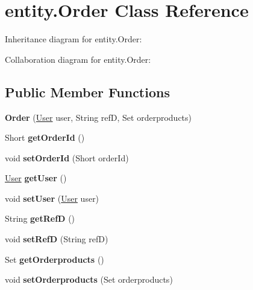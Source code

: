 \hypertarget{classentity_1_1_order}{}\section{entity.\+Order Class Reference}
\label{classentity_1_1_order}


Inheritance diagram for entity.\+Order\+:


Collaboration diagram for entity.\+Order\+:
\subsection*{Public Member Functions}
\begin{DoxyCompactItemize}
\item 
\mbox{\label{classentity_1_1_order_af212fb624e97bd3a5b0613ca0cca037a}} 
{\bfseries Order} (\mbox{\hyperlink{classentity_1_1_user}{User}} user, String refD, Set orderproducts)
\item 
\mbox{\label{classentity_1_1_order_a6490d0b20fe93bf9384417498ce3f386}} 
Short {\bfseries get\+Order\+Id} ()
\item 
\mbox{\label{classentity_1_1_order_a6cafe81270bff8ea2118ff9ed6a6a69b}} 
void {\bfseries set\+Order\+Id} (Short order\+Id)
\item 
\mbox{\label{classentity_1_1_order_a5262114e6d86f0826384b5aebaa04856}} 
\mbox{\hyperlink{classentity_1_1_user}{User}} {\bfseries get\+User} ()
\item 
\mbox{\label{classentity_1_1_order_ad8de4f52695d2a9230e9bdb0aa42decb}} 
void {\bfseries set\+User} (\mbox{\hyperlink{classentity_1_1_user}{User}} user)
\item 
\mbox{\label{classentity_1_1_order_ab64bb885e24a96a2ff986b2fbf0b2c5b}} 
String {\bfseries get\+RefD} ()
\item 
\mbox{\label{classentity_1_1_order_aa125109f293fde17d80b7195623464ff}} 
void {\bfseries set\+RefD} (String refD)
\item 
\mbox{\label{classentity_1_1_order_ac70533a078f70b1c5b6b08d1c2692ecd}} 
Set {\bfseries get\+Orderproducts} ()
\item 
\mbox{\label{classentity_1_1_order_a5f1db8a7ef8cc6def647d88a215ea362}} 
void {\bfseries set\+Orderproducts} (Set orderproducts)
\end{DoxyCompactItemize}


